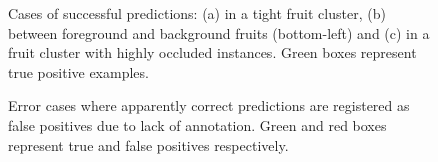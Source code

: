  \begin{figure}[!ht]
  \centering
  \caption{Cases of successful predictions: (a) in a tight fruit cluster, (b) between foreground and background fruits (bottom-left) and (c) in a fruit cluster with highly occluded instances. Green boxes represent true positive examples.}
  \label{fig1}
\end{figure}

 \begin{figure}[!ht]
  \centering
  \caption{Error cases where apparently correct predictions are registered as false positives due to lack of annotation. Green and red boxes represent true and false positives respectively.}
  \label{fig2}
\end{figure}

